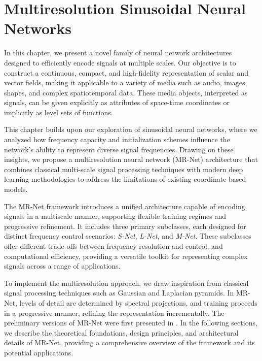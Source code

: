 \chapter{Multiresolution Sinusoidal Neural Networks}
\label{chap:mr_snn}

In this chapter, we present a novel family of neural network architectures designed to efficiently encode signals at multiple scales. Our objective is to construct a continuous, compact, and high-fidelity representation of scalar and vector fields, making it applicable to a variety of media such as audio, images, shapes, and complex spatiotemporal data. These media objects, interpreted as signals, can be given explicitly as attributes of space-time coordinates or implicitly as level sets of functions.

This chapter builds upon our exploration of sinusoidal neural networks, where we analyzed how frequency capacity and initialization schemes influence the network's ability to represent diverse signal frequencies. Drawing on these insights, we propose a multiresolution neural network (MR-Net) architecture that combines classical multi-scale signal processing techniques with modern deep learning methodologies to address the limitations of existing coordinate-based models.

The MR-Net framework introduces a unified architecture capable of encoding signals in a multiscale manner, supporting flexible training regimes and progressive refinement. It includes three primary subclasses, each designed for distinct frequency control scenarios: \emph{S-Net}, \emph{L-Net}, and \emph{M-Net}. These subclasses offer different trade-offs between frequency resolution and control, and computational efficiency, providing a versatile toolkit for representing complex signals across a range of applications.

To implement the multiresolution approach, we draw inspiration from classical signal processing techniques such as Gaussian and Laplacian pyramids. In MR-Net, levels of detail are determined by spectral projections, and training proceeds in a progressive manner, refining the representation incrementally. The preliminary versions of MR-Net were first presented in \cite{paz2022,paz2023mr}. In the following sections, we describe the theoretical foundations, design principles, and architectural details of MR-Net, providing a comprehensive overview of the framework and its potential applications.

